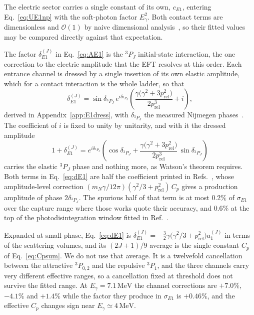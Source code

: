 \documentclass[
  aps,prd,twocolumn,nofootinbib,superscriptaddress,
  longbibliography,floatfix,preprintnumbers
]{revtex4-2}
\newcommand{\prel}{p_{\mathrm{rel}}}
\newcommand{\Egam}{E_{\gamma}}
\newcommand{\Eone}{E1}
\begin{document}
The electric sector carries a single constant of its own, $c_{\Eone}$, entering
Eq.~\eqref{eq:UE1np} with the soft-photon factor $\Egam^{2}$. Both contact terms are
dimensionless and $\mathcal{O}(1)$ by naive dimensional
analysis~\cite{Manohar:1983md}, so their
fitted values may be compared directly against that expectation.

The factor $\delta_{\Eone}^{(J)}$ in Eq.~\eqref{eq:AE1} is the $^{3}P_{J}$
initial-state interaction, the one correction to the electric amplitude that the
EFT resolves at this order. Each entrance channel is dressed by a single insertion
of its own elastic amplitude, which for a contact interaction is the whole ladder,
so that
\begin{equation}
  \delta_{\Eone}^{(J)} = \sin\delta_{^{3}P_{J}}\,e^{i\delta_{^{3}P_{J}}}
      \left(\frac{\gamma\big(\gamma^{2}+3\prel^{2}\big)}{2\prel^{3}}+i\right),
  \label{eq:dE1}
\end{equation}
derived in Appendix~\ref{app:E1dress}, with $\delta_{^{3}P_{J}}$ the measured
Nijmegen phases~\cite{Stoks:1993tb,PavonValderrama:2004se}. The coefficient of $i$
is fixed to unity by unitarity, and with it the dressed amplitude
\begin{equation}
  1+\delta_{\Eone}^{(J)} = e^{i\delta_{^{3}P_{J}}}
    \left(\cos\delta_{^{3}P_{J}}
      +\frac{\gamma\big(\gamma^{2}+3\prel^{2}\big)}{2\prel^{3}}\,
       \sin\delta_{^{3}P_{J}}\right)
  \label{eq:dE1watson}
\end{equation}
carries the elastic ${}^{3}P_{J}$ phase and nothing more, as Watson's theorem
requires. Both terms in Eq.~\eqref{eq:dE1} are half the coefficient printed in
Refs.~\cite{Chen:1999bg,Rupak:1999rk}, whose amplitude-level correction
$(m_{N}\gamma/12\pi)(\gamma^{2}/3+\prel^{2})\,C_{p}$ gives a production amplitude
of phase $2\delta_{^{3}P_{J}}$. The spurious half of that term is at most $0.2\%$
of $\sigma_{\Eone}$ over the capture range where those works quote their accuracy,
and $0.6\%$ at the top of the photodisintegration window fitted in
Ref.~\cite{Rupak:1999rk}.

Expanded at small phase, Eq.~\eqref{eq:dE1} is
$\delta_{\Eone}^{(J)}=-\tfrac{3}{2}\gamma\big(\gamma^{2}/3+\prel^{2}\big)a_{1}^{(J)}$ in terms of
the scattering volumes, and its $(2J+1)/9$ average is the single constant $C_{p}$ of
Eq.~\eqref{eq:Cpsum}. We do not use that average. It is a twelvefold cancellation
between the attractive $^{3}P_{0,2}$ and the repulsive $^{3}P_{1}$, and the three
channels carry very different effective ranges, so a cancellation fixed at threshold
does not survive the fitted range. At $\Egam=7.1\,\mathrm{MeV}$ the channel
corrections are $+7.0\%$, $-4.1\%$ and $+1.4\%$ while the factor they produce in
$\sigma_{\Eone}$ is $+0.46\%$, and the effective $C_{p}$ changes sign near
$\Egam\simeq4\,\mathrm{MeV}$. 
\end{document}
